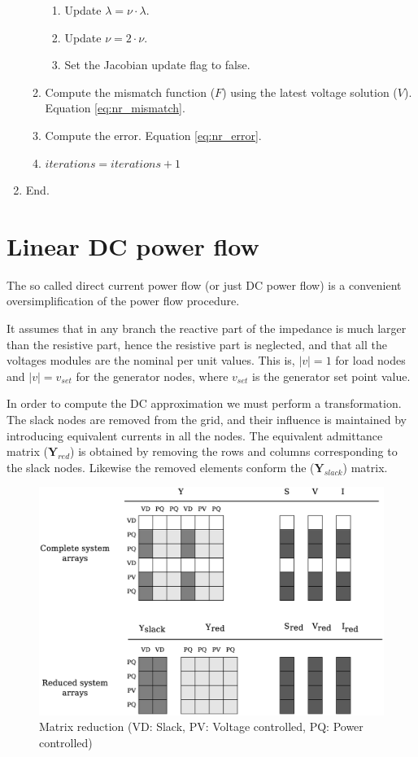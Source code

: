\documentclass[nols,a4paper,twoside,notoc,fleqn]{tufte-book}
\begin{document}
\begin{enumerate}
\begin{enumerate}
\begin{enumerate}
		\item Update $\lambda = \nu \cdot \lambda$.
		
		\item Update $\nu = 2 \cdot \nu$.
		
		\item Set the Jacobian update flag to false.
		\end{enumerate}
	
	\item Compute the mismatch function ($F$) using the latest voltage solution ($V$). Equation \ref{eq:nr_mismatch}.
	
	\item Compute the error. Equation \ref{eq:nr_error}.
	
	\item $iterations = iterations + 1$
	\end{enumerate}

\item End.
\end{enumerate}

\section{Linear DC power flow}
The so called direct current power flow (or just DC power flow) is a convenient oversimplification of the power flow procedure.

It assumes that in any branch the reactive part of the impedance is much larger than the resistive part, hence the resistive part is neglected, and that all the voltages modules are the nominal per unit values. This is, $|v|=1$ for load nodes and $|v|=v_{set}$ for the generator nodes, where $v_{set}$ is the generator set point value.

In order to compute the DC approximation we must perform a transformation. The slack nodes are removed from the grid, and their influence is maintained by introducing equivalent currents in all the nodes. The equivalent admittance matrix ($\textbf{Y}_{red}$) is obtained by removing the rows and columns corresponding to the slack nodes. Likewise the removed elements conform the ($\textbf{Y}_{slack}$) matrix.

\begin{figure}[h!]
	\centering
	\includegraphics[width=0.85\linewidth]{img/Matrix_reduction.eps}
	\caption{Matrix reduction (VD: Slack, PV: Voltage controlled, PQ: Power controlled)}
	\label{fig:Matrix_reduction}
\end{figure}
\end{document}
